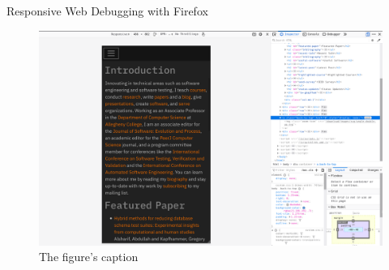 \documentclass[14pt,aspectratio=169]{beamer}
\begin{document}
%
\begin{frame}{Responsive Web Debugging with Firefox}
  \begin{figure}
    \centering
    \includegraphics[scale=.085]{images/responsive-mode-firefox.png}
    \caption{The figure's caption}
  \end{figure}
\end{frame}
\end{document}

